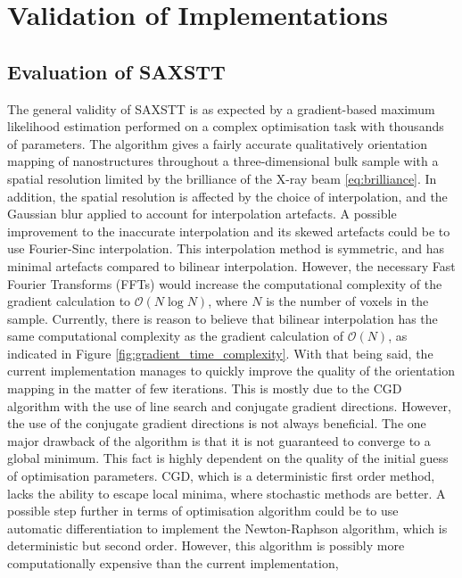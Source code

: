 \chapter{Validation of Implementations} \label{ch:validation_discussion}

\section{Evaluation of SAXSTT}
\label{sec:validity_saxstt}
The general validity of SAXSTT is as expected by a gradient-based maximum likelihood estimation performed on a complex optimisation task with thousands of parameters.
The algorithm gives a fairly accurate qualitatively orientation mapping of nanostructures
throughout a three-dimensional bulk sample with a spatial resolution limited by the brilliance of the X-ray beam \eqref{eq:brilliance}.
In addition, the spatial resolution is affected by the choice of interpolation, and the Gaussian blur applied to account for interpolation artefacts.
A possible improvement to the inaccurate interpolation and its skewed artefacts could be to use Fourier-Sinc interpolation. %
This interpolation method is symmetric, and has minimal artefacts compared to bilinear interpolation.
However, the necessary Fast Fourier Transforms (FFTs) would increase the computational complexity of the gradient calculation to $\mathcal{O}(N\log{}N)$,
where $N$ is the number of voxels in the sample. %
Currently, there is reason to believe that bilinear interpolation has the same computational complexity as the gradient calculation of $\mathcal{O}(N)$, as indicated in Figure \ref{fig:gradient_time_complexity}.
With that being said, the current implementation manages to quickly improve the quality of the orientation mapping in the matter of few iterations.
This is mostly due to the CGD algorithm with the use of line search and conjugate gradient directions.
However, the use of the conjugate gradient directions is not always beneficial.
The one major drawback of the algorithm is that it is not guaranteed to converge to a global minimum.
This fact is highly dependent on the quality of the initial guess of optimisation parameters.
CGD, which is a deterministic first order method, lacks the ability to escape local minima,
where stochastic methods are better. %
A possible step further in terms of optimisation algorithm could be to use automatic differentiation to implement the Newton-Raphson algorithm, which is deterministic but second order.
However, this algorithm is possibly more computationally expensive than the current implementation,
